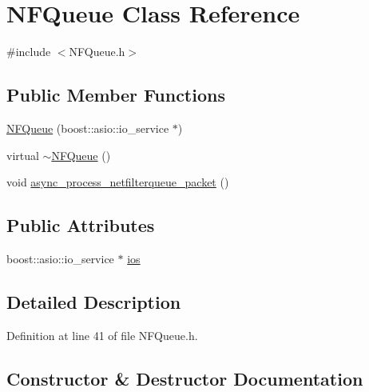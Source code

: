 \hypertarget{class_n_f_queue}{}\section{N\+F\+Queue Class Reference}
\label{class_n_f_queue}


{\ttfamily \#include $<$N\+F\+Queue.\+h$>$}

\subsection*{Public Member Functions}
\begin{DoxyCompactItemize}
\item 
\hyperlink{class_n_f_queue_a8fbffa750318af4d6a9323a2ab50b409}{N\+F\+Queue} (boost\+::asio\+::io\+\_\+service $\ast$)
\item 
virtual \hyperlink{class_n_f_queue_a5755ef3cf16e5a80d129f09c920a09d6}{$\sim$\+N\+F\+Queue} ()
\item 
void \hyperlink{class_n_f_queue_af92f81186532c755361d278f423d4bfb}{async\+\_\+process\+\_\+netfilterqueue\+\_\+packet} ()
\end{DoxyCompactItemize}
\subsection*{Public Attributes}
\begin{DoxyCompactItemize}
\item 
boost\+::asio\+::io\+\_\+service $\ast$ \hyperlink{class_n_f_queue_acebef7ff7290fbadb7fd04ff3075130c}{ios}
\end{DoxyCompactItemize}


\subsection{Detailed Description}


Definition at line 41 of file N\+F\+Queue.\+h.



\subsection{Constructor \& Destructor Documentation}
